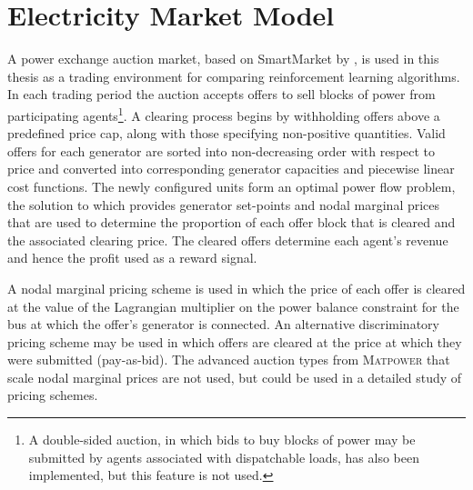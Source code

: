\section{Electricity Market Model}
A power exchange auction market, based on SmartMarket by
, is used in this thesis as a trading environment
for comparing reinforcement learning algorithms.  In each trading period the
auction accepts offers to sell blocks of power from participating
agents\footnote{A double-sided auction, in which bids to buy blocks of power may
be submitted by agents associated with dispatchable loads, has also been
implemented, but this feature is not used.}.
A clearing process begins by withholding offers above a predefined price cap,
along with those specifying non-positive quantities.  Valid offers for each
generator are sorted into non-decreasing order with respect to price and
converted into corresponding generator capacities and piecewise linear cost
functions.  The newly configured units form an optimal power flow problem, the
solution to which provides generator set-points and nodal marginal prices that
are used to determine the proportion of each offer block that is cleared and the
associated clearing price.  The cleared offers determine each agent's revenue
and hence the profit used as a reward signal.


A nodal marginal pricing scheme is used in which the price of each offer is
cleared at the value of the Lagrangian multiplier on the power balance
constraint for the bus at which the offer's generator is connected. An
alternative discriminatory pricing scheme may be used in which offers are
cleared at the price at which they were submitted (pay-as-bid).  The advanced
auction types from \textsc{Matpower} that scale nodal marginal prices are not
used, but could be used in a detailed study of pricing schemes.

